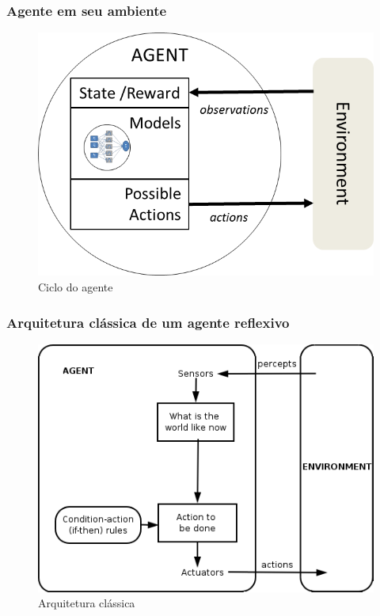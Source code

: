\documentclass[10pt]{beamer}
\begin{document}
\begin{frame}

  \frametitle{Agente em seu ambiente}
    
\begin{figure}[!ht]
  \centering
  \includegraphics[height =.6\textheight,width=.7\textwidth]{figuras/agente_ambiente_ciclo.png}
  \caption{Ciclo do agente}
\end{figure}
    
\end{frame}



\begin{frame}

  \frametitle{Arquitetura clássica de um agente reflexivo}
    
\begin{figure}[!ht]
\centering
\includegraphics[width=.6\textwidth]{figuras/agent-reflexivo.png}
\caption{Arquitetura clássica}
\label{ag_01}
\end{figure}
    
\end{frame}
\end{document}
